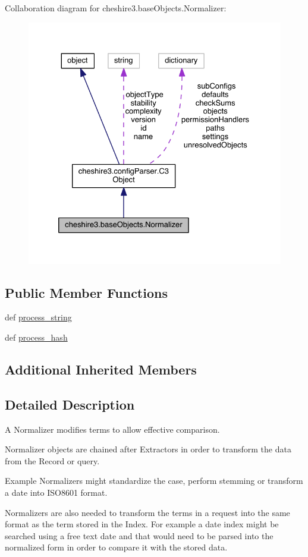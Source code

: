 Collaboration diagram for cheshire3.\-base\-Objects.\-Normalizer\-:
\nopagebreak
\begin{figure}[H]
\begin{center}
\leavevmode
\includegraphics[width=328pt]{classcheshire3_1_1base_objects_1_1_normalizer__coll__graph}
\end{center}
\end{figure}
\subsection*{Public Member Functions}
\begin{DoxyCompactItemize}
\item 
def \hyperlink{classcheshire3_1_1base_objects_1_1_normalizer_a5ebeb17a40ed6d4258d6fd362441de50}{process\-\_\-string}
\item 
def \hyperlink{classcheshire3_1_1base_objects_1_1_normalizer_a04e2152bdb3b3a00f4ea023049545525}{process\-\_\-hash}
\end{DoxyCompactItemize}
\subsection*{Additional Inherited Members}


\subsection{Detailed Description}
\begin{DoxyVerb}A Normalizer modifies terms to allow effective comparison.

Normalizer objects are chained after Extractors in order to transform the 
data from the Record or query.

Example Normalizers might standardize the case, perform stemming or 
transform a date into ISO8601 format.

Normalizers are also needed to transform the terms in a request into the 
same format as the term stored in the Index. For example a date index might 
be searched using a free text date and that would need to be parsed into 
the normalized form in order to compare it with the stored data.
\end{DoxyVerb}
 

